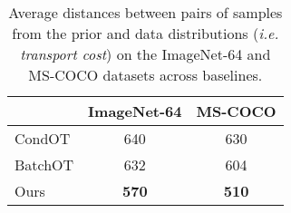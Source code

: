 \begin{table}[t]
    \caption{Average distances between pairs of
    samples from the prior and data distributions (\emph{i.e. transport cost}) on the ImageNet-64 and MS-COCO datasets across baselines.
    }
    \vskip 0.05in
    \centering
    \begin{tabular}{lcc}
    \toprule
               & ImageNet-64 & MS-COCO\\
            \midrule
            CondOT & 640 & 630\\
            BatchOT & 632 & 604 \\
            Ours & \textbf{570} & \textbf{510}  \\

\bottomrule
    \end{tabular}
    \label{tab:wasserstein_table}
\vspace{-0.25cm}
\end{table}
